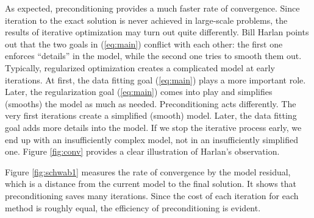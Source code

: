 As expected,
preconditioning provides a much faster rate of convergence.
Since iteration to the exact solution
is never achieved in large-scale problems,
the results of iterative optimization may turn out quite differently.
Bill Harlan points out that the two goals
in (\ref{eq:main}) conflict with each other:
the first one enforces ``details'' in the model,
while the second one tries to smooth them out.
Typically, regularized optimization creates
a complicated model at early iterations.
At first, the data fitting goal (\ref{eq:main}) plays a more important role.
Later, the regularization goal (\ref{eq:main}) comes into play
and simplifies (smooths) the model as much as needed.
Preconditioning acts differently.
The very first iterations create a simplified (smooth) model.
Later, the data fitting goal adds more details into the model.
If we stop the iterative process early,
we end up with an insufficiently complex model,
not in an insufficiently simplified one.
Figure \ref{fig:conv} provides a clear illustration of Harlan's observation.

\par
Figure \ref{fig:schwab1}
measures the rate of convergence by the model residual,
which is a distance from the current model to the final solution.
It shows that preconditioning saves many iterations.
Since the cost of each iteration for each method is roughly equal,
the efficiency of preconditioning is evident.

\begin{comment}
\par
The module \texttt{invint2} \vpageref{lst:invint2}
invokes the solvers to make
Figures \ref{fig:conv}
and
\ref{fig:schwab1}.
We use convolution with
\texttt{helicon} \vpageref{lst:helicon}
for the regularization
and we use deconvolution with
\texttt{polydiv} \vpageref{lst:polydiv}
for the preconditioning.
The code looks fairly straightforward except for
the oxymoron
\texttt{known=aa\%mis}.

\moddex{invint2}{Inverse linear interpolation}        
\end{comment}

